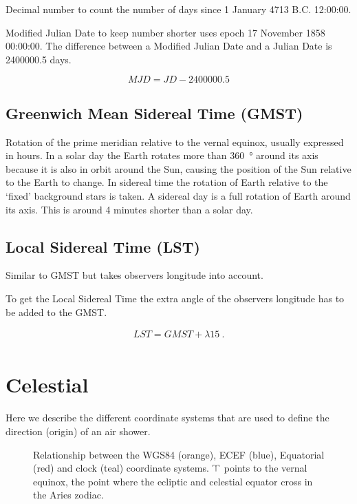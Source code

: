 Decimal number to count the number of days since 1 January 4713 B.C.
12:00:00.

Modified Julian Date to keep number shorter uses epoch 17 November 1858
00:00:00. The difference between a Modified Julian Date and a Julian
Date is 2400000.5 days.

\begin{equation}
    MJD = JD - 2400000.5
\end{equation}


\subsection{Greenwich Mean Sidereal Time (GMST)}

Rotation of the prime meridian relative to the vernal equinox, usually
expressed in hours. In a solar day the Earth rotates more than
\SI{360}{\degree} around its axis because it is also in orbit around the
Sun, causing the position of the Sun relative to the Earth to change. In
sidereal time the rotation of Earth relative to the `fixed' background
stars is taken. A sidereal day is a full rotation of Earth around its
axis. This is around 4 minutes shorter than a solar day.

\cite{kaplan:2011aa}


\subsection{Local Sidereal Time (LST)}

Similar to GMST but takes observers longitude into account.

To get the Local Sidereal Time the extra angle of the observers
longitude has to be added to the GMST.

\begin{equation}
    \begin{array}{l}
        \mathit{LST} = \mathit{GMST} + \lambda 15 \ . \\
    \end{array}
\end{equation}

\section{Celestial}

Here we describe the different coordinate systems that are used to
define the direction (origin) of an air shower.

\begin{figure}
    \centering
    
    \caption{Relationship between the WGS84 (orange), ECEF (blue),
             Equatorial (red) and clock (teal) coordinate systems.
             $\vernal$ points to the vernal equinox, the point where the
             ecliptic and celestial equator cross in the Aries zodiac.}
    \label{fig:wgs84_equatorial}
\end{figure}


